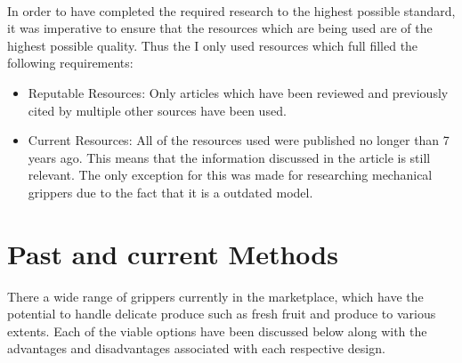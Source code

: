 \documentclass[11pt]{article}
\begin{document}
\\
\newline
In order to have completed the required research to the highest possible standard, it was imperative to ensure that the resources which are being used are of the highest possible quality. Thus the I only used resources which full filled the following requirements:
\begin{itemize}
\item Reputable Resources: Only articles which have been reviewed and previously cited by multiple other sources have been used.
\item Current Resources: All of the resources used were published no longer than 7 years ago. This means that the information discussed in the article is still relevant. The only exception for this was made for researching mechanical grippers due to the fact that it is a outdated model.
\end{itemize}
\section{Past and current Methods}
There a wide range of grippers currently in the marketplace, which have the potential to handle delicate produce such as fresh fruit and produce to various extents. Each of the viable options have been discussed below along with the advantages and disadvantages associated with each respective design.
\end{document}

